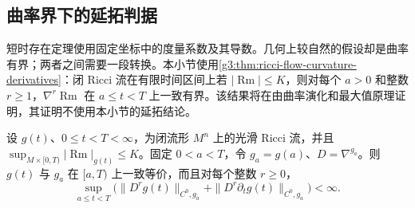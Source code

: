 \subsection{曲率界下的延拓判据}
\label{g3:subsec:2702:05}
短时存在定理使用固定坐标中的度量系数及其导数。几何上较自然的假设却是曲率有界；两者之间需要一段转换。本小节使用\cref{g3:thm:ricci-flow-curvature-derivatives}：闭 Ricci 流在有限时间区间上若 \(|\operatorname{Rm}|\le K\)，则对每个 \(a>0\) 和整数 \(r\ge1\)，\(\nabla^r\operatorname{Rm}\) 在 \(a\le t<T\) 上一致有界。该结果将在由曲率演化和最大值原理证明，其证明不使用本小节的延拓结论。

\begin{lemma}\label{g3:lem:ricci-fixed-coordinate-control}
 设 \(g(t)\)、\(0\le t<T<\infty\)，为闭流形 \(M^n\) 上的光滑 Ricci 流，并且 \(\sup_{M\times[0,T)}|\operatorname{Rm}|_{g(t)}\le K\)。固定 \(0<a<T\)，令 \(g_a=g(a)\)、\(D=\nabla^{g_a}\)。则 \(g(t)\) 与 \(g_a\) 在 \([a,T)\) 上一致等价，而且对每个整数 \(r\ge0\)，
 \[
  \sup_{a\le t<T}\bigl(
   \|D^rg(t)\|_{C^0,g_a}+\|D^r\partial_tg(t)\|_{C^0,g_a}
  \bigr)<\infty.
 \]
\end{lemma}

